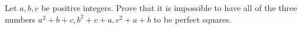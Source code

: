 Let $a,b,c$ be positive integers. Prove that it is impossible to have all of the three numbers $a^2+b+c,b^2+c+a,c^2+a+b$ to be perfect squares.